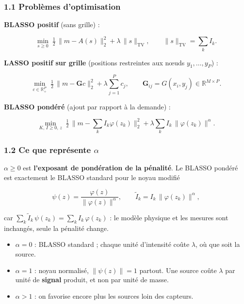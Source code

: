 \documentclass[
  french,
]{article}
\providecommand{\tightlist}{%
  \setlength{\itemsep}{0pt}\setlength{\parskip}{0pt}}
\begin{document}
\subsubsection{1.1 Problèmes
d'optimisation}\label{probluxe8mes-doptimisation}

\textbf{BLASSO positif} (sans grille) :

\[
\min_{s\ge 0}\; \tfrac12\,\lVert m - A(s)\rVert_2^2 + \lambda\,\lVert s\rVert_{\mathrm{TV}},
\qquad \lVert s\rVert_{\mathrm{TV}} = \sum_k I_k .
\]

\textbf{LASSO positif sur grille} (positions restreintes aux nœuds
\(y_1,\dots,y_P\)) :

\[
\min_{c\in\mathbb{R}^P_{+}}\; \tfrac12\,\lVert m - \mathbf{G}c\rVert_2^2 + \lambda\sum_{j=1}^{P} c_j,
\qquad \mathbf{G}_{ij} = G(x_i, y_j)\in\mathbb{R}^{M\times P}.
\]

\textbf{BLASSO pondéré} (ajout par rapport à la demande) :

\[
\min_{K,\,I\ge 0,\,z}\; \tfrac12\,\Big\lVert m - \sum_k I_k\varphi(z_k)\Big\rVert_2^2
+ \lambda\sum_k I_k\,\lVert\varphi(z_k)\rVert^{\alpha}.
\]

\subsubsection{\texorpdfstring{1.2 Ce que représente
\(\alpha\)}{1.2 Ce que représente \textbackslash alpha}}\label{ce-que-repruxe9sente-alpha}

\(\alpha \ge 0\) est \textbf{l'exposant de pondération de la pénalité}.
Le BLASSO pondéré est exactement le BLASSO standard pour le noyau
modifié

\[
\psi(z) = \frac{\varphi(z)}{\lVert\varphi(z)\rVert^{\alpha}},
\qquad \tilde I_k = I_k\,\lVert\varphi(z_k)\rVert^{\alpha},
\]

car \(\sum_k \tilde I_k\,\psi(z_k) = \sum_k I_k\,\varphi(z_k)\) : le
modèle physique et les mesures sont inchangés, seule la pénalité change.

\begin{itemize}
\tightlist
\item
  \(\alpha = 0\) : BLASSO standard ; chaque unité d'intensité coûte
  \(\lambda\), où que soit la source.
\item
  \(\alpha = 1\) : noyau normalisé, \(\lVert\psi(z)\rVert = 1\) partout.
  Une source coûte \(\lambda\) par unité de \textbf{signal} produit, et
  non par unité de masse.
\item
  \(\alpha > 1\) : on favorise encore plus les sources loin des
  capteurs.
\end{itemize}
\end{document}
